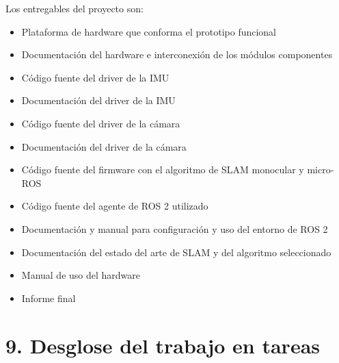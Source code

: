 \documentclass[
11pt, %
codirector, %
]{charter}
\begin{document}
Los entregables del proyecto son:
\begin{itemize}
	\item Plataforma de hardware que conforma el prototipo funcional
	\item Documentación del hardware e interconexión de los módulos componentes
	\item Código fuente del driver de la IMU
	\item Documentación del driver de la IMU
	\item Código fuente del driver de la cámara
	\item Documentación del driver de la cámara
	\item Código fuente del firmware con el algoritmo de SLAM monocular y micro-ROS
	\item Código fuente del agente de ROS 2 utilizado
	\item Documentación y manual para configuración y uso del entorno de ROS 2
	\item Documentación del estado del arte de SLAM y del algoritmo seleccionado
	\item Manual de uso del hardware
	\item Informe final
\end{itemize}

\section{9. Desglose del trabajo en tareas}
\label{sec:wbs}
\end{document}
